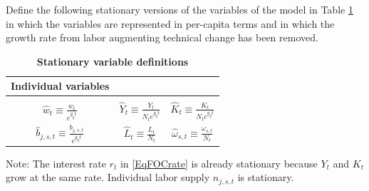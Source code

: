 \documentclass[letterpaper,12pt]{article}
\theoremstyle{definition}
\begin{document}
\begin{spacing}{1.5}
    Define the following stationary versions of the variables of the model in Table \ref{TabStatVars} in which the variables are represented in per-capita terms and in which the growth rate from labor augmenting technical change has been removed.

    \begin{table}[htbp] \centering \captionsetup{width=3.3in}
    \caption{\label{TabStatVars}\textbf{Stationary variable definitions}}
      \begin{threeparttable}
      \begin{tabular}{>{\small}c |>{\small}c >{\small}c}
        \hline\hline
        Individual variables & \multicolumn{2}{c}{Aggregate variables} \\
        \hline
        & & \\[-4mm]
        $\hat{w}_t\equiv \frac{w_t}{e^{g_y t}}$ & $\hat{Y}_t\equiv\frac{Y_t}{N_t e^{g_y t}}$ & $\hat{K}_t\equiv\frac{K_t}{N_t e^{g_y t}}$ \\[2mm]
        $\hat{b}_{j,s,t}\equiv \frac{b_{j,s,t}}{e^{g_y t}}$ & $\hat{L}_t\equiv\frac{L_t}{N_t}$ & $\hat{\omega}_{s,t}\equiv\frac{\omega_{s,t}}{N_t}$ \\[2mm]
        \hline\hline
      \end{tabular}
      \begin{tablenotes}
        \scriptsize{\item[]Note: The interest rate $r_t$ in \eqref{EqFOCrate} is already stationary because $Y_t$ and $K_t$ grow at the same rate. Individual labor supply $n_{j,s,t}$ is stationary.}
      \end{tablenotes}
      \end{threeparttable}
    \end{table}


\end{spacing}
\end{document}
